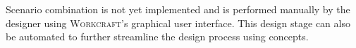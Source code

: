\documentclass[british, journal]{IEEEtran}
\newcommand{\noun}[1]{\textsc{#1}}
\begin{document}
Scenario combination is not yet implemented and is performed manually by
the designer using \noun{Workcraft}'s graphical user interface. This
design stage can also be automated to further streamline the design process
using concepts.

\end{document}
